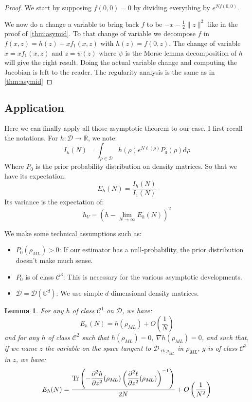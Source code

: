 \documentclass[10pt,a4paper]{report}
\theoremstyle{plain}
\newtheorem{lem}[thm]{Lemma}
\theoremstyle{definition}
\theoremstyle{remark}
\newcommand{\R}{\ensuremath{\mathbb{R}}}
\newcommand{\C}{\ensuremath{\mathbb{C}}}
\newcommand{\dd}{\mathrm{d}}
\newcommand{\dparn}[3]{\frac{\partial^{#3} {#1}}{\partial{#2}^{#3}}}
\DeclareMathOperator{\Tr}{Tr}
\DeclareMathOperator{\rk}{rk}
\newcommand{\class}[1]{{\mathscr{C}^{#1}}}
\newcommand{\ml}{_{M\!L}}
\begin{document}
\begin{proof}
  We start by supposing $f(0,0) = 0$ by dividing everything by $e^{Nf(0,0)}$.

  We now do a change a variable to bring back $f$ to be $-x -\frac12\|z\|^2$ like in
  the proof of \cref{thm:asymid}.
  To that change of variable we decompose $f$ in $f(x,z) = h(z) + xf_1(x,z)$
  with $h(z) = f(0,z)$. The change of variable $\tilde x = xf_1(x,z)$ and
  $\tilde z = \psi(z)$ where $\psi$ is the Morse lemma decomposition of $h$ will
  give the right result. Doing the actual variable change and computing the
  Jacobian is left to the reader.
  The regularity analysis is the same as in \cref{thm:asymid}
\end{proof}



\subsection{Application}

Here we can finally apply all those asymptotic theorem to our case. I first recall the
notations. For $h : \mathcal{D} \to \R$, we note:
\begin{equation}
I_h(N) = \int_{\rho\in\mathcal{D}} h(\rho) e^{N\ell(\rho)} P_0(\rho) \dd \rho
\end{equation}
Where $P_0$ is the prior probability distribution on density matrices.
So that we have its expectation:
\begin{equation}
E_h(N) = \frac{I_h(N)}{I_1(N)}
\end{equation}
Its variance is the expectation of:
\begin{equation}
h_V = {\left(h - \lim_{N \to \infty} E_h(N)\right)}^2
\end{equation}

We make some technical assumptions such as:
\begin{itemize}
\item $P_0(\rho\ml) > 0$: If our estimator has a null-probability, the prior
  distribution doesn't make much sense.
\item $P_0$ is of class $\class 3$: This is necessary for the various asymptotic developments.
\item $\mathcal{D} = \mathcal{D}(\C^d)$: We use simple $d$-dimensional density matrices.
\end{itemize}


\begin{lem}\label{lem:asymain}
  For any $h$ of class $\class 1$ on $\mathcal{D}$, we have:
  \[E_h(N) = h(\rho\ml) + O\left(\frac 1N\right)\]
  and for any $h$  of class $\class 2$ such that $h(\rho\ml) = 0$, $\nabla
  h(\rho\ml) = 0$, and such that,
  if we name $z$ the variable on the space tangent to $\mathcal{D}_{\rk
    \rho\ml}$ in $\rho\ml$, $g$ is of class $\class 3$ in $z$, we have:
  \[E_h(N) = \frac{\displaystyle \Tr \left( - \dparn h z 2 (\rho\ml)  \left( \dparn \ell z
        2(\rho\ml)\right)\inv\right)}{2N} + O\left(\frac 1 {N^2}\right)\]
\end{lem}
\end{document}
